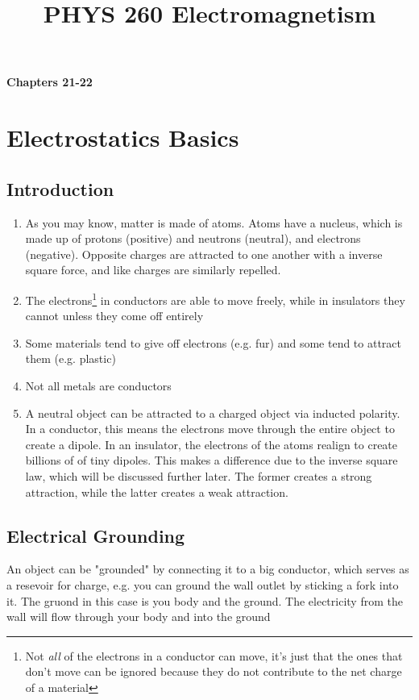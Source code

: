 \documentclass[10pt, a4paper, twocolumn]{article}
\title{PHYS 260 Electromagnetism}
\author{\authorstyle{Miles Kent}}
\date{}
\begin{document}
\maketitle

\textbf{\huge Chapters 21-22}
    \section{Electrostatics Basics}    
        \subsection{Introduction}
            \begin{enumerate}
                \item {
                    As you may know, matter is made of atoms.
                    Atoms have a nucleus, which is made up of protons (positive) and neutrons (neutral), and electrons (negative).
                    Opposite charges are attracted to one another with a inverse square force, and like charges are similarly repelled.
                }
                \item {
                    The electrons\footnote{Not \textit{all} of the electrons in a conductor can move, it's just that the ones that don't move can be ignored because they do not contribute to the net charge of a material} in conductors are able to move freely, while in insulators they cannot unless they come off entirely
                }
                \item {
                    Some materials tend to give off electrons (e.g. fur) and some tend to attract them (e.g. plastic)   
                }
                \item {
                    Not all metals are conductors
                }
                \item {
                    A neutral object can be attracted to a charged object via inducted polarity. In a conductor, this means the electrons move through the entire object to create a dipole. In an insulator, the electrons of the atoms realign to create billions of of tiny dipoles. This makes a difference due to the inverse square law, which will be discussed further later. The former creates a strong attraction, while the latter creates a weak attraction.
                }
            \end{enumerate}
        \subsection{Electrical Grounding}
            An object can be "grounded" by connecting it to a big conductor, which serves as a resevoir for charge, e.g. you can ground the wall outlet by sticking a fork into it. The gruond in this case is you body and the ground. The electricity from the wall will flow through your body and into the ground
\end{document}
